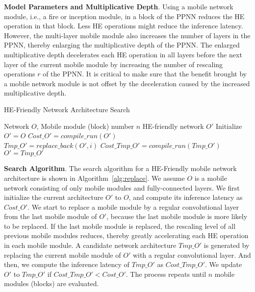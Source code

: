 \documentclass{article}
\begin{document}
\textbf{Model Parameters and Multiplicative Depth}. Using a mobile network module, i.e., a fire or inception module, in a block of the PPNN reduces the HE operation in that block. Less HE operations might reduce the inference latency. However, the multi-layer mobile module also increases the number of layers in the PPNN, thereby enlarging the multiplicative depth of the PPNN. The enlarged multiplicative depth decelerates each HE operation in all layers before the next layer of the current mobile module by increasing the number of rescaling operations $r$ of the PPNN. It is critical to make sure that the benefit brought by a mobile network module is not offset by the deceleration caused by the increased multiplicative depth.



\setlength{\textfloatsep}{10pt}
\begin{algorithm}[tb!]
		\caption{HE-Friendly Network Architecture Search}
		\label{alg:replace}
		\begin{algorithmic}[1]
			 Network $O$, Mobile module (block) number $n$
			 HE-friendly network $O'$
			\STATE Initialize $O' = O$
			\STATE  $Cost\_O' = compile\_run(O')$\\
			\STATE  $Tmp\_O' = replace\_back(O', i)$
			\STATE  $Cost\_Tmp\_O' = compile\_run(Tmp\_O' )$
			\STATE $O' = Tmp\_O'$
			\ENDIF
			\ENDFOR
		\end{algorithmic}
\end{algorithm}
	
	
	  

\textbf{Search Algorithm}. The search algorithm for a HE-Friendly mobile network architecture is shown in Algorithm~\ref{alg:replace}. We assume $O$ is a mobile network consisting of only mobile modules and fully-connected layers. We first initialize the current architecture $O'$ to $O$, and compute its inference latency as $Cost\_O'$. We start to replace a mobile module by a regular convolutional layer from the last mobile module of $O'$, because the last mobile module is more likely to be replaced. If the last mobile module is replaced, the rescaling level of all previous mobile modules reduces, thereby greatly accelerating each HE operation in each mobile module. A candidate network architecture $Tmp\_O'$ is generated by replacing the current mobile module of $O'$  with a regular convolutional layer. And then, we compute the inference latency of $Tmp\_O'$ as $Cost\_Tmp\_O'$. We update $O'$ to $Tmp\_O'$ if $Cost\_Tmp\_O' < Cost\_O'$. The process repeats until $n$ mobile modules (blocks) are evaluated. 
\end{document}
